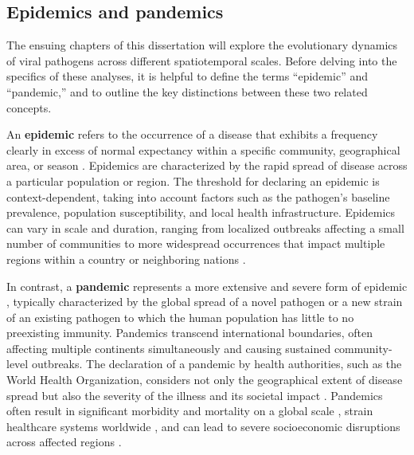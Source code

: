 \subsection{Epidemics and pandemics}\label{sec:epidemicsVsPandemics}
The ensuing chapters of this dissertation will explore the evolutionary dynamics of viral pathogens across different spatiotemporal scales.
Before delving into the specifics of these analyses, it is helpful to define the terms ``epidemic'' and ``pandemic,'' and to outline the key distinctions between these two related concepts.

An \textbf{epidemic} refers to the occurrence of a disease that exhibits a frequency clearly in excess of normal expectancy within a specific community, geographical area, or season \citep{morens2009pandemic}.
Epidemics are characterized by the rapid spread of disease across a particular population or region.
The threshold for declaring an epidemic is context-dependent, taking into account factors such as the pathogen's baseline prevalence, population susceptibility, and local health infrastructure.
Epidemics can vary in scale and duration, ranging from localized outbreaks affecting a small number of communities \citep{moncla2021repeated} to more widespread occurrences that impact multiple regions within a country or neighboring nations \citep{dudas2017virus}.

In contrast, a \textbf{pandemic} represents a more extensive and severe form of epidemic \citep{morens2009pandemic}, typically characterized by the global spread of a novel pathogen or a new strain of an existing pathogen to which the human population has little to no preexisting immunity.
Pandemics transcend international boundaries, often affecting multiple continents simultaneously and causing sustained community-level outbreaks.
The declaration of a pandemic by health authorities, such as the World Health Organization, considers not only the geographical extent of disease spread but also the severity of the illness and its societal impact \citep{world2009pandemic}.
Pandemics often result in significant morbidity and mortality on a global scale \citep{Morens2007}, strain healthcare systems worldwide \citep{kaye2021economic}, and can lead to severe socioeconomic disruptions across affected regions \citep{almeida2021impact}.


